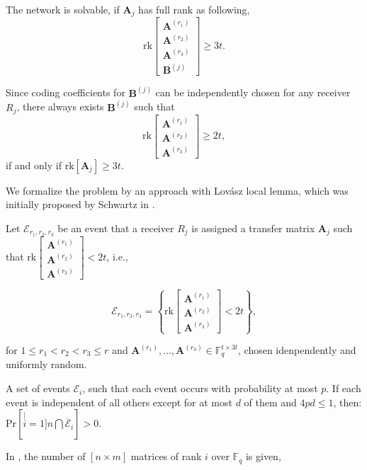 The network is solvable, if $\boldsymbol{A}_{j}$ has full rank as
following,
\[
\mathrm{rk}\left[\begin{array}{c}
\boldsymbol{A}^{\left(r_{1}\right)}\\
\boldsymbol{A}^{\left(r_{2}\right)}\\
\boldsymbol{A}^{\left(r_{3}\right)}\\
\boldsymbol{B}^{\left(j\right)}
\end{array}\right]\geq3t.
\]

Since coding coefficients for $\boldsymbol{B}^{\left(j\right)}$ can
be independently chosen for any receiver $R_{j}$, there always exists
$\boldsymbol{B}^{\left(j\right)}$ such that
\begin{equation}
\mathrm{rk}\left[\begin{array}{c}
\boldsymbol{A}^{\left(r_{1}\right)}\\
\boldsymbol{A}^{\left(r_{2}\right)}\\
\boldsymbol{A}^{\left(r_{3}\right)}
\end{array}\right]\geq2t,\label{eq:rk_rqm_e1l1h3s4}
\end{equation}
if and only if $\mathrm{rk}\left[\boldsymbol{A}_{j}\right]\geq3t$.

We formalize the problem by an approach with Lov\'asz local lemma,
which was initially proposed by Schwartz in \cite{MosheSchwartz:2018}.

Let $\mathcal{E}_{r_{1},r_{2},r_{3}}$ be an event that a receiver
$R_{j}$ is assigned a transfer matrix $\boldsymbol{A}_{j}$ such
that $\mathrm{rk}\left[\begin{array}{c}
\boldsymbol{A}^{\left(r_{1}\right)}\\
\boldsymbol{A}^{\left(r_{2}\right)}\\
\boldsymbol{A}^{\left(r_{3}\right)}
\end{array}\right]<2t$, i.e.,

\[
\mathcal{E}_{r_{1},r_{2},r_{3}}=\left\{ \mathrm{rk}\left[\begin{array}{c}
\boldsymbol{A}^{\left(r_{1}\right)}\\
\boldsymbol{A}^{\left(r_{2}\right)}\\
\boldsymbol{A}^{\left(r_{3}\right)}
\end{array}\right]<2t\right\} ,
\]

for $1\leq r_{1}<r_{2}<r_{3}\leq r$ and $\boldsymbol{A}^{\left(r_{1}\right)},\ldots,\boldsymbol{A}^{\left(r_{3}\right)}\in\ensuremath{\mathbb{F}}_{q}^{t\times3t}$,
chosen idenpendently and uniformly random.
\begin{lem}
 A set of events $\mathcal{E}_{i}$, such that each event occurs
with probability at most $p$. If each event is independent of all
others except for at most $d$ of them and $4pd\leq1$, then: $\mathrm{Pr}\left[\stackrel[i=1]{n}{\bigcap}\overline{\mathcal{E}}_{i}\right]>0$.
\label{thm:LLL}
\end{lem}
In \cite{Overbeck:2007}, the number of $\left[n\times m\right]$
matrices of rank $i$ over $\ensuremath{\mathbb{F}}_{q}$ is given,

